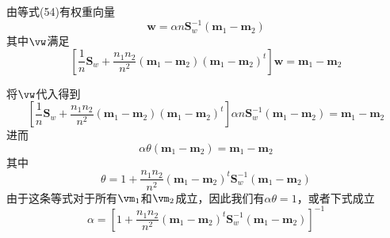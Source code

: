 \documentclass[reportComp]{thesis}
\begin{document}
\begin{answer}[\textsection 5 Q21]
由等式(54)有权重向量
\[\mathbf{w}=\alpha n \mathbf{S}_{w}^{-1}\left(\mathbf{m}_{1}-\mathbf{m}_{2}\right)\]
其中$\vw$满足
\[\left[\frac{1}{n} \mathbf{S}_{w}+\frac{n_{1} n_{2}}{n^{2}}\left(\mathbf{m}_{1}-\mathbf{m}_{2}\right)\left(\mathbf{m}_{1}-\mathbf{m}_{2}\right)^{t}\right] \mathbf{w}=\mathbf{m}_{1}-\mathbf{m}_{2}\]

将$\vw$代入得到
\[\left[\frac{1}{n} \mathbf{S}_{w}+\frac{n_{1} n_{2}}{n^{2}}\left(\mathbf{m}_{1}-\mathbf{m}_{2}\right)\left(\mathbf{m}_{1}-\mathbf{m}_{2}\right)^{t}\right] \alpha n \mathbf{S}_{w}^{-1}\left(\mathbf{m}_{1}-\mathbf{m}_{2}\right)=\mathbf{m}_{1}-\mathbf{m}_{2}\]
进而
\[\alpha \theta\left(\mathbf{m}_{1}-\mathbf{m}_{2}\right)=\mathbf{m}_{1}-\mathbf{m}_{2}\]
其中
\[\theta=1+\frac{n_{1} n_{2}}{n^{2}}\left(\mathbf{m}_{1}-\mathbf{m}_{2}\right)^{t} \mathbf{S}_{w}^{-1}\left(\mathbf{m}_{1}-\mathbf{m}_{2}\right)\]
由于这条等式对于所有$\vm_1$和$\vm_2$成立，因此我们有$\alpha\theta=1$，或者下式成立
\[\alpha=\left[1+\frac{n_{1} n_{2}}{n^{2}}\left(\mathbf{m}_{1}-\mathbf{m}_{2}\right)^{t} \mathbf{S}_{w}^{-1}\left(\mathbf{m}_{1}-\mathbf{m}_{2}\right)\right]^{-1}\]
\end{answer}
\end{document}
